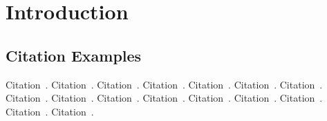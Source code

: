 
\chapter{Introduction}\label{chapter:introduction}

\section{Citation Examples}
Citation~\parencite{rfc-9000}.
Citation~\parencite{draft-moqtransport}.
Citation~\parencite{article-quic-usage}.
Citation~\parencite{internet-quic-usage}.
Citation~\parencite{facebook-quic-usage}.
Citation~\parencite{google-quic-usage}.
Citation~\parencite{quic-nic-offload}.
Citation~\parencite{quic-explained}.
Citation~\parencite{equic-gateway}.
Citation~\parencite{quic-nic-offload-patent}.
Citation~\parencite{kernel-bypass-msc-thesis}.
Citation~\parencite{quic-go-repo}.
Citation~\parencite{quic-go-prio-packs-repo}.
Citation~\parencite{adaptive-moq-repo}.
Citation~\parencite{priority-moqtransport-repo}.
Citation~\parencite{fast-relays-thesis-repo}.





